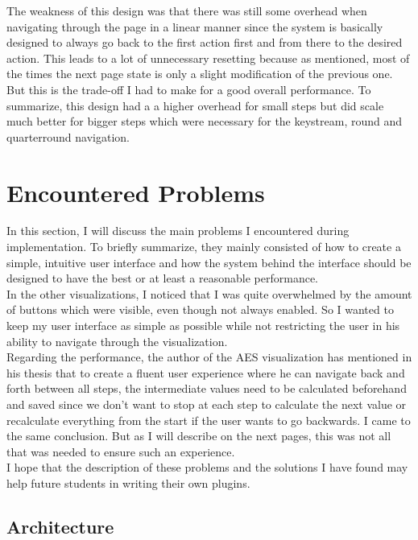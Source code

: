 The weakness of this design was that there was still some overhead when navigating through the page in a linear manner since the system is basically designed to always go back to the first action first and from there to the desired action. This leads to a lot of unnecessary resetting because as mentioned, most of the times the next page state is only a slight modification of the previous one. But this is the trade-off I had to make for a good overall performance. To summarize, this design had a a higher overhead for small steps but did scale much better for bigger steps which were necessary for the keystream, round and quarterround navigation. 


\section{Encountered Problems}
\label{sec:encounteredProblems}

In this section, I will discuss the main problems I encountered during implementation. To briefly summarize, they mainly consisted of how to create a simple, intuitive user interface and how the system behind the interface should be designed to have the best or at least a reasonable performance. \\
In the other visualizations, I noticed that I was quite overwhelmed by the amount of buttons which were visible, even though not always enabled. So I wanted to keep my user interface as simple as possible while not restricting the user in his ability to navigate through the visualization. \\
Regarding the performance, the author of the AES visualization has mentioned in his thesis that to create a fluent user experience where he can navigate back and forth between all steps, the intermediate values need to be calculated beforehand and saved since we don't want to stop at each step to calculate the next value or recalculate everything from the start if the user wants to go backwards. I came to the same conclusion. But as I will describe on the next pages, this was not all that was needed to ensure such an experience.\\
I hope that the description of these problems and the solutions I have found may help future students in writing their own plugins.

\subsection{Architecture}

